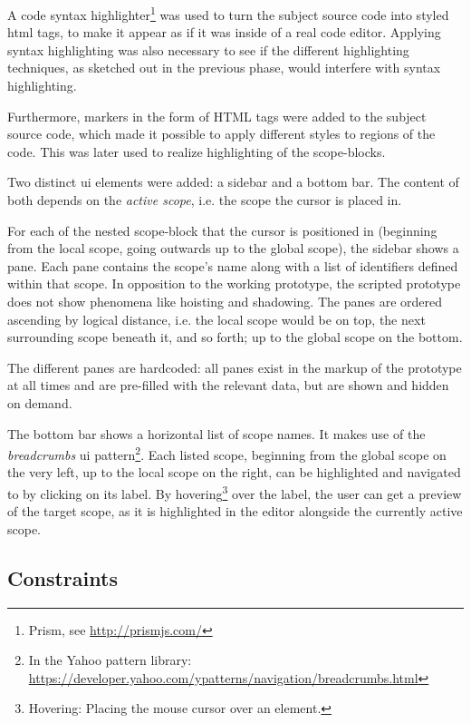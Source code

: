 A code syntax highlighter\footnote{Prism, see \url{http://prismjs.com/}}
was used to turn the subject source code into styled \ac{html} tags, to
make it appear as if it was inside of a real code editor. Applying
syntax highlighting was also necessary to see if the different
highlighting techniques, as sketched out in the previous phase, would
interfere with syntax highlighting.

Furthermore, markers in the form of HTML tags were added to the subject
source code, which made it possible to apply different
styles
to regions of the code. This was later used to realize highlighting of
the \glspl{scope-block}.

Two distinct \ac{ui} elements were added: a sidebar and a bottom bar.
The content of both depends on the \emph{active scope}, i.e. the scope
the cursor is placed in.

For each of the nested \ac{scope-block} that the cursor is positioned in
(beginning from the local scope, going outwards up to the global scope),
the sidebar shows a pane. Each pane contains the scope’s name along with
a list of identifiers defined within that scope. In opposition to the
working prototype, the scripted prototype does not show phenomena like
hoisting and shadowing. The panes are ordered ascending by logical
distance, i.e. the local scope would be on top, the next surrounding
scope beneath it, and so forth; up to the global scope on the bottom.

The different panes are hardcoded: all panes exist in the markup of the
prototype at all times and are pre-filled with the relevant data, but
are shown and hidden on demand.

The bottom bar shows a horizontal list of scope names. It makes use of
the \emph{breadcrumbs} \ac{ui}
pattern\footnote{In the Yahoo pattern library: \url{https://developer.yahoo.com/ypatterns/navigation/breadcrumbs.html}}.
Each listed scope, beginning from the global scope on the very left, up
to the local scope on the right, can be highlighted and navigated to by
clicking on its label. By
hovering\footnote{Hovering: Placing the mouse cursor over an element.}
over the label, the user can get a preview of the target scope, as it is
highlighted in the editor alongside the currently active scope.

\subsection{Constraints}\label{constraints}

